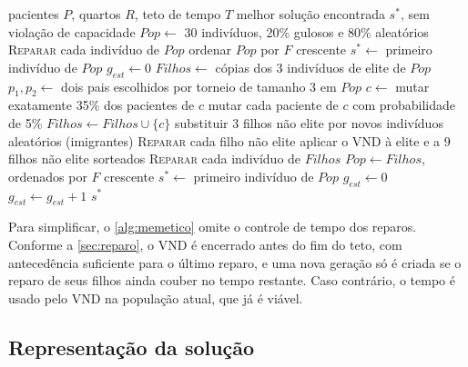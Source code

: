 \begin{algorithm}[!htb]
\caption{Algoritmo memético com etapa de reparo da capacidade}
\label{alg:memetico}
\begin{algorithmic}[1]
\Require pacientes $P$, quartos $R$, teto de tempo $T$
\Ensure melhor solução encontrada $s^*$, sem violação de capacidade
\State $Pop \gets$ 30 indivíduos, 20\% gulosos e 80\% aleatórios 
\State \textsc{Reparar} cada indivíduo de $Pop$ 
\State ordenar $Pop$ por $F$ crescente
\State $s^* \gets$ primeiro indivíduo de $Pop$
\State $g_{est} \gets 0$ 
    \State $Filhos \gets$ cópias dos 3 indivíduos de elite de $Pop$
        \State $p_1, p_2 \gets$ dois pais escolhidos por torneio de tamanho 3 em $Pop$
        \State $c \gets$  
            \State mutar exatamente 35\% dos pacientes de $c$
        \Else
            \State mutar cada paciente de $c$ com probabilidade de 5\%
        \EndIf
        \State $Filhos \gets Filhos \cup \{c\}$
    \EndWhile
    \State substituir 3 filhos não elite por novos indivíduos aleatórios (imigrantes)
    \State \textsc{Reparar} cada filho não elite
    \State aplicar o VND à elite e a 9 filhos não elite sorteados 
    \State \textsc{Reparar} cada indivíduo de $Filhos$
    \State $Pop \gets Filhos$, ordenados por $F$ crescente
        \State $s^* \gets$ primeiro indivíduo de $Pop$
        \State $g_{est} \gets 0$
    \Else
        \State $g_{est} \gets g_{est} + 1$
    \EndIf
\EndWhile
\State \Return $s^*$
\end{algorithmic}
\end{algorithm}

Para simplificar, o \autoref{alg:memetico} omite o controle de tempo dos reparos. Conforme a \autoref{sec:reparo}, o VND é encerrado antes do fim do teto, com antecedência suficiente para o último reparo, e uma nova geração só é criada se o reparo de seus filhos ainda couber no tempo restante. Caso contrário, o tempo é usado pelo VND na população atual, que já é viável.

\subsection{Representação da solução}
\label{sec:representacao-solucao}

